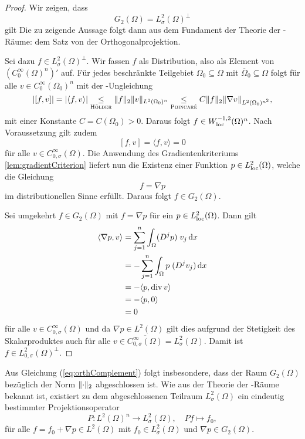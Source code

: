 \begin{proof}
  Wir zeigen, dass 
  \begin{equation}
    \label{eq:orthComplement}
    G_2(\Omega) = L_\sigma^2(\Omega)^\perp
  \end{equation}
  gilt
  Die zu zeigende Aussage folgt dann aus dem Fundament der Theorie der \hilbert\hyp{}Räume: dem Satz von der Orthogonalprojektion.

  Sei dazu $f \in L_\sigma^2(\Omega)^\perp$.
  Wir fassen $f$ als Distribution, also als Element von $(C_0^\infty(\Omega)^n)'$ auf.
  Für jedes beschränkte Teilgebiet $\Omega_0 \subseteq \Omega$ mit $\overline\Omega_0 \subseteq \Omega$ folgt für alle $v \in C_0^\infty(\Omega_0)^n$ mit der \poincare\hyp{}Ungleichung
  $$
  |[f, v]| 
  = |\langle f, v \rangle| 
  \underset{\hoelder}{\leq}  \norm{f}_2 \norm{v}_{L^2(\Omega_0)^n}
  \underset{\poincare}{\leq} C \norm{f}_2 \norm{\nabla v}_{L^2(\Omega_0)^{n^2}},
  $$
  mit einer Konstante $C = C(\Omega_0) > 0$.
  Daraus folgt $f \in W_{\loc}^{-1,2}(\Omega)^n$.
  Nach Voraussetzung gilt zudem 
  $$
  [f,v] = \langle f, v \rangle = 0
  $$
  für alle $v \in C_{0, \sigma}^\infty(\Omega)$.
  Die Anwendung des Gradientenkriteriums \ref{lem:gradientCriterion} liefert nun die Existenz einer Funktion $p \in L_{\loc}^2(\Omega)$, welche die Gleichung
  $$
  f = \nabla p
  $$
  im distributionellen Sinne erfüllt.
  Daraus folgt $f \in G_2(\Omega)$.

  Sei umgekehrt $f \in G_2(\Omega)$ mit $f = \nabla p$ für ein $p \in L^2_{\loc}(\Omega)$.
  Dann gilt
  \begin{align*}
  \langle \nabla p, v \rangle
  &= \sum_{j = 1}^n \int_\Omega (D^j p)\;v_j \d x \\
  &= - \sum_{j = 1}^n \int_\Omega p\;(D^j v_j) \d x \\
  &= - \langle p, \div v \rangle  \\
  &= - \langle p, 0 \rangle  \\
  &= 0
  \end{align*}
  für alle $v \in C_{0, \sigma}^\infty(\Omega)$ und da $\nabla p \in L^2(\Omega)$ gilt dies aufgrund der Stetigkeit des Skalarproduktes auch für alle $v \in \overline{C_{0, \sigma}^\infty(\Omega)} = L_\sigma^2(\Omega)$.
  Damit ist $f \in L_{0,\sigma}^2(\Omega)^\perp$.
\end{proof}

Aus Gleichung (\ref{eq:orthComplement}) folgt insbesondere, dass der Raum $G_2(\Omega)$ bezüglich der Norm $\norm{\cdot}_2$ abgeschlossen ist.
Wie aus der Theorie der \hilbert\hyp{}Räume bekannt ist, existiert zu dem abgeschlossenen Teilraum $L_\sigma^2(\Omega)$ ein eindeutig bestimmter Projektionsoperator
$$
P \colon L^2(\Omega)^n \to L_\sigma^2(\Omega),\quad Pf \mapsto f_0,
$$
für alle $f = f_0 + \nabla p \in L^2(\Omega)$ mit $f_0 \in L_\sigma^2(\Omega)$ und $\nabla p \in G_2(\Omega)$.

